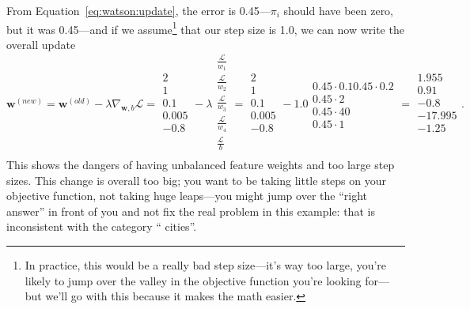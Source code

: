 From Equation~\ref{eq:watson:update}, the error is 0.45---$\pi_i$ should have
been zero, but it was 0.45---and if we assume\footnote{In practice, this would
  be a really bad step size---it's way too large, you're likely to jump over
  the valley in the objective function you're looking for---but we'll go with
  this because it makes the math easier.} that our step size is 1.0,
%
we can now write the overall update
\begin{equation}
  {\bm w}^{(new)} = {\bm w}^{(old)} - \lambda \nabla_{{\bm w}, b} \mathcal{L} = 
  \begin{array}{c}
    2 \\
1  \\
0.1  \\
  0.005  \\
  -0.8 \\
\end{array} - \lambda  \begin{array}{c}
\frac{\mathcal{L}}{w_1}  \\
\frac{\mathcal{L}}{w_2}  \\
  \frac{\mathcal{L}}{w_3}  \\
  \frac{\mathcal{L}}{w_4}  \\  
\frac{\mathcal{L}}{b}  \\  
\end{array}
= \begin{array}{c}
  2\\
1  \\
0.1  \\
  0.005  \\
  -0.8 \\
\end{array} - 1.0  \begin{array}{c}
  0.45 \cdot 0.1
0.45 \cdot 0.2  \\
0.45 \cdot 2 \\
  0.45 \cdot 40 \\
  0.45 \cdot 1
\end{array} = \begin{array}{c}
  1.955 \\
0.91  \\
-0.8  \\
  -17.995  \\
  -1.25 \\
\end{array}.
\label{eq:watson:update-ex}
\end{equation}
This shows the dangers of having unbalanced feature weights and too large step
sizes.  This change is overall too big; you want to be taking little steps on
your objective function, not taking huge leaps---you might jump over the
``right answer'' in front of you and not fix the real problem in this example:
that  is inconsistent with the category `` cities''.

